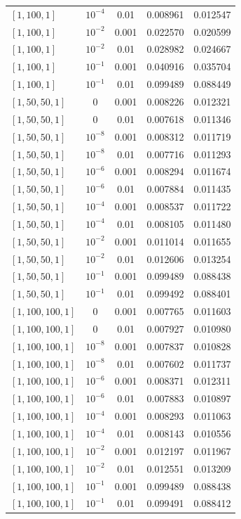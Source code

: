 \documentclass[aps,rmp,reprint,amsmath,amssymb,graphicx,longbibliography]{revtex4-1}
\begin{document}
\begin{table}[p]
\begin{ruledtabular}
\begin{tabular}{lccrr}
$[1,100,1]$ & $10^{-4}$ & 0.01 & 0.008961 & 0.012547 \\
$[1,100,1]$ & $10^{-2}$ & 0.001 & 0.022570 & 0.020599 \\
$[1,100,1]$ & $10^{-2}$ & 0.01 & 0.028982 & 0.024667 \\
$[1,100,1]$ & $10^{-1}$ & 0.001 & 0.040916 & 0.035704 \\
$[1,100,1]$ & $10^{-1}$ & 0.01 & 0.099489 & 0.088449 \\
$[1,50,50,1]$ & $0$ & 0.001 & 0.008226 & 0.012321 \\
$[1,50,50,1]$ & $0$ & 0.01 & 0.007618 & 0.011346 \\
$[1,50,50,1]$ & $10^{-8}$ & 0.001 & 0.008312 & 0.011719 \\
$[1,50,50,1]$ & $10^{-8}$ & 0.01 & 0.007716 & 0.011293 \\
$[1,50,50,1]$ & $10^{-6}$ & 0.001 & 0.008294 & 0.011674 \\
$[1,50,50,1]$ & $10^{-6}$ & 0.01 & 0.007884 & 0.011435 \\
$[1,50,50,1]$ & $10^{-4}$ & 0.001 & 0.008537 & 0.011722 \\
$[1,50,50,1]$ & $10^{-4}$ & 0.01 & 0.008105 & 0.011480 \\
$[1,50,50,1]$ & $10^{-2}$ & 0.001 & 0.011014 & 0.011655 \\
$[1,50,50,1]$ & $10^{-2}$ & 0.01 & 0.012606 & 0.013254 \\
$[1,50,50,1]$ & $10^{-1}$ & 0.001 & 0.099489 & 0.088438 \\
$[1,50,50,1]$ & $10^{-1}$ & 0.01 & 0.099492 & 0.088401 \\
$[1,100,100,1]$ & $0$ & 0.001 & 0.007765 & 0.011603 \\
$[1,100,100,1]$ & $0$ & 0.01 & 0.007927 & 0.010980 \\
$[1,100,100,1]$ & $10^{-8}$ & 0.001 & 0.007837 & 0.010828 \\
$[1,100,100,1]$ & $10^{-8}$ & 0.01 & 0.007602 & 0.011737 \\
$[1,100,100,1]$ & $10^{-6}$ & 0.001 & 0.008371 & 0.012311 \\
$[1,100,100,1]$ & $10^{-6}$ & 0.01 & 0.007883 & 0.010897 \\
$[1,100,100,1]$ & $10^{-4}$ & 0.001 & 0.008293 & 0.011063 \\
$[1,100,100,1]$ & $10^{-4}$ & 0.01 & 0.008143 & 0.010556 \\
$[1,100,100,1]$ & $10^{-2}$ & 0.001 & 0.012197 & 0.011967 \\
$[1,100,100,1]$ & $10^{-2}$ & 0.01 & 0.012551 & 0.013209 \\
$[1,100,100,1]$ & $10^{-1}$ & 0.001 & 0.099489 & 0.088438 \\
$[1,100,100,1]$ & $10^{-1}$ & 0.01 & 0.099491 & 0.088412 \\
\end{tabular}
\end{ruledtabular}
\end{table}
\end{document}
